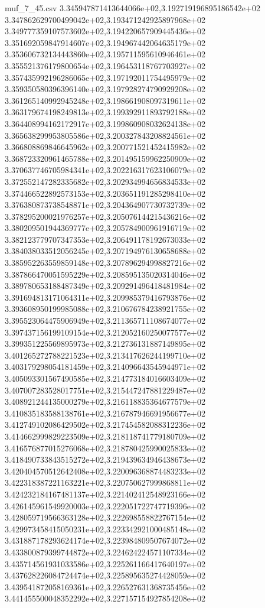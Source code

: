 \begin{filecontents*}{muf_7_45.csv}
3.345947871413644066e+02,3.192719196895186542e+02
3.347862629700499042e+02,3.193471242925897968e+02
3.349777359107573602e+02,3.194220657909445436e+02
3.351692059847914607e+02,3.194967442064635179e+02
3.353606732134443860e+02,3.195711595610946461e+02
3.355521376179800654e+02,3.196453118767703927e+02
3.357435992196286065e+02,3.197192011754495979e+02
3.359350580396396140e+02,3.197928274790929208e+02
3.361265140992945248e+02,3.198661908097319611e+02
3.363179674198249813e+02,3.199392911893792188e+02
3.364408994162172917e+02,3.199860908032624138e+02
3.365638299953805586e+02,3.200327843208824561e+02
3.366808869846645962e+02,3.200771521452415982e+02
3.368723320961465788e+02,3.201495159962250909e+02
3.370637746705984341e+02,3.202216317623106079e+02
3.372552147282335682e+02,3.202934994656834533e+02
3.374466522892573153e+02,3.203651191285298410e+02
3.376380873738548871e+02,3.204364907730732739e+02
3.378295200021976257e+02,3.205076144215436216e+02
3.380209501944369777e+02,3.205784900961916719e+02
3.382123779707347353e+02,3.206491178192673033e+02
3.384038033512056245e+02,3.207194976130658688e+02
3.385952263559859148e+02,3.207896294998827216e+02
3.387866470051595229e+02,3.208595135020314046e+02
3.389780653188487349e+02,3.209291496418481984e+02
3.391694813171064311e+02,3.209985379416793876e+02
3.393608950199985088e+02,3.210676784238921755e+02
3.395523064475906949e+02,3.211365711108674077e+02
3.397437156199109154e+02,3.212052160250077577e+02
3.399351225569895973e+02,3.212736131887149895e+02
3.401265272788221523e+02,3.213417626244199710e+02
3.403179298054181459e+02,3.214096643545944971e+02
3.405093301567490585e+02,3.214773184016603409e+02
3.407007283528017751e+02,3.215447247881229487e+02
3.408921244135000279e+02,3.216118835364677579e+02
3.410835183588138761e+02,3.216787946691956677e+02
3.412749102086429502e+02,3.217454582088312236e+02
3.414662999829223509e+02,3.218118741779180709e+02
3.416576877015276068e+02,3.218780425990025833e+02
3.418490733843515272e+02,3.219439634946438673e+02
3.420404570512642408e+02,3.220096368874483233e+02
3.422318387221163221e+02,3.220750627999868811e+02
3.424232184167481137e+02,3.221402412548923166e+02
3.426145961549920003e+02,3.222051722747719396e+02
3.428059719566363128e+02,3.222698558822767154e+02
3.429973458415050231e+02,3.223342921000485148e+02
3.431887178293624174e+02,3.223984809507674072e+02
3.433800879399744872e+02,3.224624224571107334e+02
3.435714561931033586e+02,3.225261166417640197e+02
3.437628226084724474e+02,3.225895635274428059e+02
3.439541872058169361e+02,3.226527631368735456e+02
3.441455500048352292e+02,3.227157154927854208e+02

\end{filecontents*}
